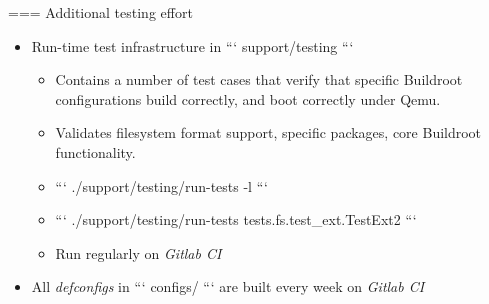 === {Additional testing effort}
  \begin{itemize}
  \item Run-time test infrastructure in ``` support/testing ```
    \begin{itemize}
    \item Contains a number of test cases that verify that specific
      Buildroot configurations build correctly, and boot correctly
      under Qemu.
    \item Validates filesystem format support, specific packages, core
      Buildroot functionality.
    \item ``` ./support/testing/run-tests -l ```
    \item ``` ./support/testing/run-tests tests.fs.test_ext.TestExt2 ```
    \item Run regularly on {\em Gitlab CI}
    \end{itemize}
  \item All {\em defconfigs} in ``` configs/ ``` are built every week
    on {\em Gitlab CI}
  \end{itemize}

